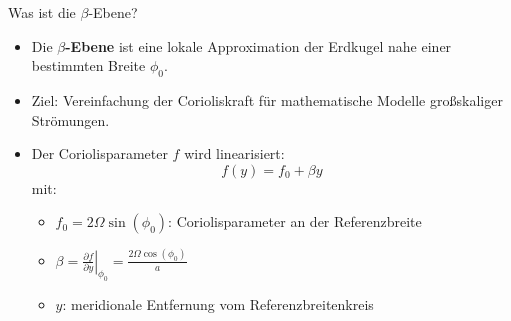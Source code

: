 

\begin{frame}{Was ist die \(\beta\)-Ebene?}
	\begin{itemize}
		\item Die \textbf{\(\beta\)-Ebene} ist eine lokale Approximation der Erdkugel nahe einer bestimmten Breite \(\phi_0\).
		\item Ziel: Vereinfachung der Corioliskraft für mathematische Modelle großskaliger Strömungen.
		\item Der Coriolisparameter \(f\) wird linearisiert:
		      \[
			      f(y) = f_0 + \beta y
		      \]
		      mit:
		      \begin{itemize}
			      \item \(f_0 = 2\Omega \sin(\phi_0)\): Coriolisparameter an der Referenzbreite
			      \item \(\beta = \left.\frac{\partial f}{\partial y}\right|_{\phi_0} = \frac{2\Omega \cos(\phi_0)}{a}\)
			      \item \(y\): meridionale Entfernung vom Referenzbreitenkreis
		      \end{itemize}
	\end{itemize}
\end{frame}

